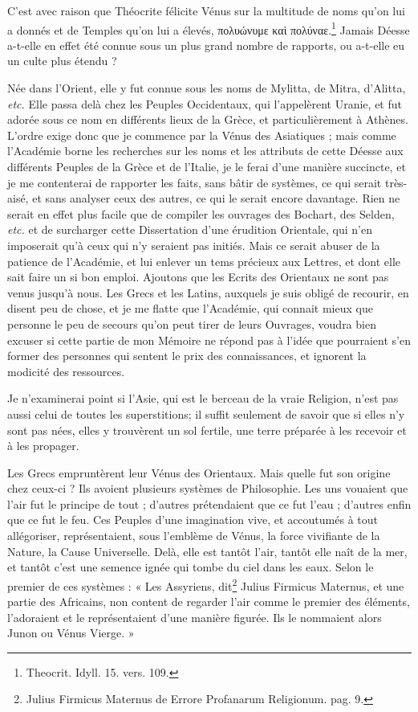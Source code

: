 \documentclass[a4paper, 18pt, oneside]{article}
\begin{document}
C'est avec raison que Théocrite félicite Vénus sur la multitude de noms qu'on lui a donnés et de Temples qu'on lui a élevés, πολυώνυμε καὶ πολύναε.\footnote{Theocrit. Idyll. 15. vers. 109.} Jamais Déesse a-t-elle en effet été connue sous un plus grand nombre de rapports, ou a-t-elle eu un culte plus étendu ?

Née dans l'Orient, elle y fut connue sous les noms de Mylitta, de Mitra, d'Alitta, \emph{etc.} Elle passa delà chez les Peuples Occidentaux, qui l'appelèrent Uranie, et fut adorée sous ce nom en différents lieux de la Grèce, et particulièrement à Athènes. L'ordre exige donc que je commence par la Vénus des Asiatiques ; mais comme l'Académie borne les recherches sur les noms et les attributs de cette Déesse aux différents Peuples de la Grèce et de l'Italie, je le ferai d'une manière succincte, et je me contenterai de rapporter les faits, sans bâtir de systèmes, ce qui serait très-aisé, et sans analyser ceux des autres, ce qui le serait encore davantage. Rien ne serait en effet plus facile que de compiler les ouvrages des Bochart, des Selden, \emph{etc.} et de surcharger cette Dissertation d'une érudition Orientale, qui n'en imposerait qu'à ceux qui n'y seraient pas initiés. Mais ce serait abuser de la patience de l'Académie, et lui enlever un tems précieux aux Lettres, et dont elle sait faire un si bon emploi. Ajoutons que les Ecrits des Orientaux ne sont pas venus jusqu'à nous. Les Grecs et les Latins, auxquels je suis obligé de recourir, en disent peu de chose, et je me flatte que l'Académie, qui connait mieux que personne le peu de secours qu'on peut tirer de leurs Ouvrages, voudra bien excuser si cette partie de mon Mémoire ne répond pas à l'idée que pourraient s'en former des personnes qui sentent le prix des connaissances, et ignorent la modicité des ressources.

Je n'examinerai point si l'Asie, qui est le berceau de la vraie Religion, n'est pas aussi celui de toutes les superstitions; il suffit seulement de savoir que si elles n'y sont pas nées, elles y trouvèrent un sol fertile, une terre préparée à les recevoir et à les propager.

Les Grecs empruntèrent leur Vénus des Orientaux. Mais quelle fut son origine chez ceux-ci ? Ils avoient plusieurs systèmes de Philosophie. Les uns vouaient que l'air fut le principe de tout ; d'autres prétendaient que ce fut l'eau ; d'autres enfin que ce fut le feu. Ces Peuples d'une imagination vive, et accoutumés à tout allégoriser, représentaient, sous l'emblème de Vénus, la force vivifiante de la Nature, la Cause Universelle. Delà, elle est tantôt l'air, tantôt elle naît de la mer, et tantôt c'est une semence ignée qui tombe du ciel dans les eaux. Selon le premier de ces systèmes : « Les Assyriens, dit\footnote{Julius Firmicus Maternus de Errore Profanarum Religionum. pag. 9.} Julius Firmicus Maternus, et une partie des Africains, non content de regarder l'air comme le premier des éléments, l'adoraient et le représentaient d'une manière figurée. Ils le nommaient alors Junon ou Vénus Vierge. »
\end{document}

